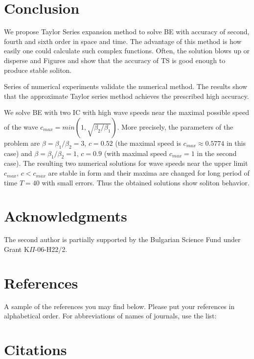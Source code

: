 \documentclass[11pt,a4paper,twoside]{article}
\begin{document}
\section{Conclusion}\label{Concl}

We propose Taylor Series expansion method to solve BE with accuracy of second, fourth and sixth order in space and time. The advantage of this method is how easily one could calculate such complex functions. Often, the solution blows up or disperse and Figures  and  show that the accuracy of TS is good enough to produce stable soliton.

Series of numerical experiments validate the numerical method. The results show that the approximate Taylor series method achieves the prescribed high accuracy. 

We solve BE  with two IC with high wave speeds near the maximal possible speed of the wave $c_{max}= min(1, \sqrt{\beta_2/{\beta_1}})$. More precisely, the parameters of the problem are $\beta =\beta_1/{\beta_2}= 3$, $c = 0.52$ (the maximal speed  is $c_{max} \approx 0.5774$  in this case) 
and $\beta =\beta_1/{\beta_2}= 1$, $c=0.9$ (with maximal speed $c_{max} = 1$ in the second case). 
The resulting two numerical solutions for wave speeds near the upper limit $c_{max} $, $c < c_{max}$ are stable in form and  their maxima are changed for long period of time $T=40$ with small errors.  Thus the obtained solutions show soliton behavior. 
\section{Acknowledgments}

The second author is  partially supported by  the Bulgarian Science Fund under Grant K$\Pi$-06-H22/2.

\section{References}

A sample of the references you may find below. Please put your
references in alphabetical order. For abbreviations of names of
journals, use the list:

\section{Citations}\label{citation}
\end{document}
